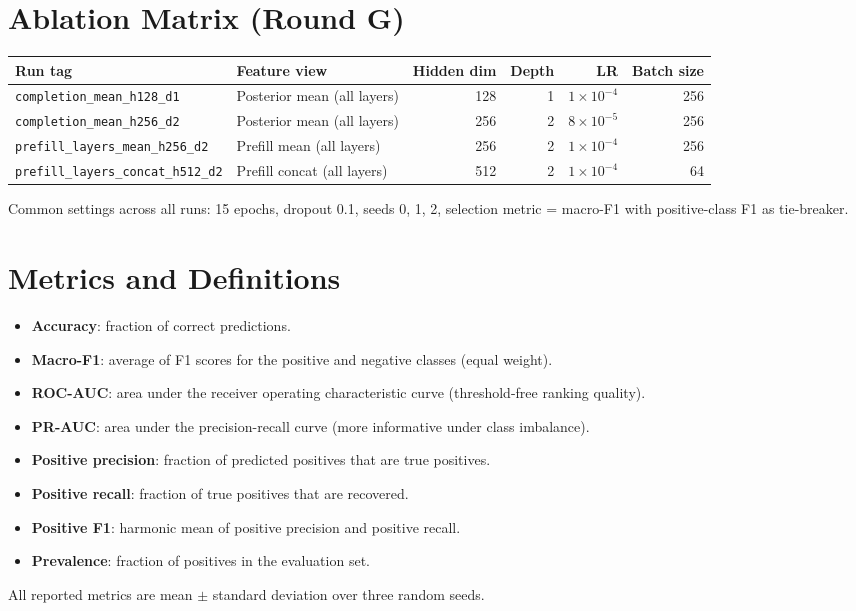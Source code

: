 \documentclass[11pt]{article}
\begin{document}
\section*{Ablation Matrix (Round G)}
\begin{center}
{\small
\setlength{\tabcolsep}{4pt}
\begin{tabular}{@{}p{3.1cm}p{4.2cm}rrrr@{}}
\toprule
Run tag & Feature view & Hidden dim & Depth & LR & Batch size \\
\midrule
\texttt{completion\_mean\_\allowbreak h128\_d1} & Posterior mean (all layers) & 128 & 1 & $1\times10^{-4}$ & 256 \\
\texttt{completion\_mean\_\allowbreak h256\_d2} & Posterior mean (all layers) & 256 & 2 & $8\times10^{-5}$ & 256 \\
\texttt{prefill\_layers\_\allowbreak mean\_h256\_d2} & Prefill mean (all layers) & 256 & 2 & $1\times10^{-4}$ & 256 \\
\texttt{prefill\_layers\_\allowbreak concat\_h512\_d2} & Prefill concat (all layers) & 512 & 2 & $1\times10^{-4}$ & 64 \\
\bottomrule
\end{tabular}
}
\end{center}
Common settings across all runs: 15 epochs, dropout 0.1, seeds {0, 1, 2},
selection metric = macro-F1 with positive-class F1 as tie-breaker.

\section*{Metrics and Definitions}
\begin{itemize}
  \item \textbf{Accuracy}: fraction of correct predictions.
  \item \textbf{Macro-F1}: average of F1 scores for the positive and negative classes (equal weight).
  \item \textbf{ROC-AUC}: area under the receiver operating characteristic curve (threshold-free ranking quality).
  \item \textbf{PR-AUC}: area under the precision-recall curve (more informative under class imbalance).
  \item \textbf{Positive precision}: fraction of predicted positives that are true positives.
  \item \textbf{Positive recall}: fraction of true positives that are recovered.
  \item \textbf{Positive F1}: harmonic mean of positive precision and positive recall.
  \item \textbf{Prevalence}: fraction of positives in the evaluation set.
\end{itemize}
All reported metrics are mean $\pm$ standard deviation over three random seeds.
\end{document}
